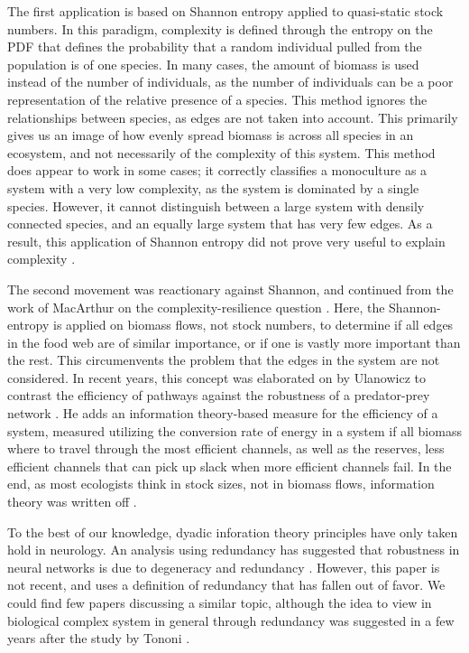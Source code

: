 \documentclass[../main.tex]{subfiles}
\begin{document}
The first application is based on Shannon entropy applied to quasi-static stock numbers.
In this paradigm, complexity is defined through the entropy on the PDF that defines the probability that a random individual pulled from the population is of one species.
In many cases, the amount of biomass is used instead of the number of individuals, as the number of individuals can be a poor representation of the relative presence of a species.
This method ignores the relationships between species, as edges are not taken into account.
This primarily gives us an image of how evenly spread biomass is across all species in an ecosystem, and not necessarily of the complexity of this system.
This method does appear to work in some cases; it correctly classifies a monoculture as a system with a very low complexity, as the system is dominated by a single species.
However, it cannot distinguish between a large system with densily connected species, and an equally large system that has very few edges.
As a result, this application of Shannon entropy did not prove very useful to explain complexity \cite{ulanowicz2001information}.

The second movement was reactionary against Shannon, and continued from the work of MacArthur on the complexity-resilience question \cite{ulanowicz2009quantifying}.
Here, the Shannon-entropy is applied on biomass flows, not stock numbers, to determine if all edges in the food web are of similar importance, or if one is vastly more important than the rest.
This circumenvents the problem that the edges in the system are not considered.
In recent years, this concept was elaborated on by Ulanowicz to contrast the efficiency of pathways against the robustness of a predator-prey network \cite{ulanowicz2009quantifying}.
He adds an information theory-based measure for the efficiency of a system, measured utilizing the conversion rate of energy in a system if all biomass where to travel through the most efficient channels, as well as the reserves, less efficient channels that can pick up slack when more efficient channels fail.
In the end, as most ecologists think in stock sizes, not in biomass flows, information theory was written off \cite{ulanowicz2001information}.

To the best of our knowledge, dyadic inforation theory principles have only taken hold in neurology.
An analysis using redundancy has suggested that robustness in neural networks is due to degeneracy and redundancy \cite{tononi1999measures}.
However, this paper is not recent, and uses a definition of redundancy that has fallen out of favor.
We could find few papers discussing a similar topic, although the idea to view in biological complex system in general through redundancy was suggested in a few years after the study by Tononi \cite{edelman2001degeneracy}.
\end{document}
